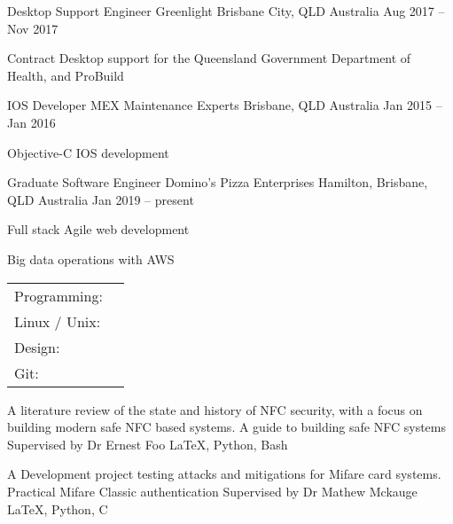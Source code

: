 \documentclass[]{awesome-cv}
\begin{document}
\vspace{-2mm}
\begin{cventries}
	\cventry
	{Desktop Support Engineer}
	{Greenlight}
	{Brisbane City, QLD Australia}
	{Aug 2017 – Nov 2017}
	{\begin{cvitems}
		\item {Contract Desktop support for the Queensland Government Department of Health, and ProBuild}
		\end{cvitems}}
	\cventry
	{IOS Developer}
	{MEX Maintenance Experts}
	{Brisbane, QLD Australia}
	{Jan 2015 – Jan 2016}
	{\begin{cvitems}
		\item {Objective-C IOS development}
		\end{cvitems}}
	\cventry
	{Graduate Software Engineer}
	{Domino's Pizza Enterprises}
	{Hamilton, Brisbane, QLD Australia}
	{Jan 2019 – present}
	{\begin{cvitems}
		\item {Full stack Agile web development}
		\item {Big data operations with AWS}
		\end{cvitems}}
\end{cventries}
\begin{cventries}
	\cventry
	{}
	{\def\arraystretch{1.15}{\begin{tabular}{ l l }
		Programming:  & {\skill{ Java, C, C++, C\#, Python, LaTeX, Javascript, Typescript, HTML, CSS}} \\
		Linux / Unix:  & {\skill{ Command line, systems/network administration}} \\
		Design:  & {\skill{ Photoshop, Frontend Web UI / UX design}} \\
		Git:  & {\skill{ Source control, collaborative programming}} \\
		\end{tabular}}}
	{}
	{}
	{}
\end{cventries}
\vspace{-7mm}
\begin{cventries}
	\cventry
	{A literature review of the state and history of NFC security, with a focus on building modern safe NFC based systems.}
	{A guide to building safe NFC systems}
	{Supervised by Dr Ernest Foo}
	{LaTeX, Python, Bash}
	{}
	
	\vspace{-5mm}
	\cventry
	{A Development project testing attacks and mitigations for Mifare card systems.}
	{Practical Mifare Classic authentication}
	{Supervised by Dr Mathew Mckauge}
	{LaTeX, Python, C}
	{}
	
	\vspace{-5mm}
\end{cventries}
\end{document}
